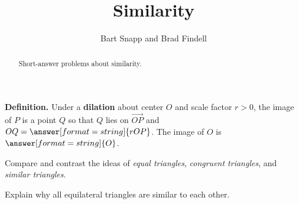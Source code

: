 \documentclass[nooutcomes]{ximera}
\title{Similarity}
\author{Bart Snapp and Brad Findell}
\begin{document}
\begin{abstract}
Short-answer problems about similarity. 
\end{abstract}
\maketitle




%
%
%
%

\begin{question}
\textbf{Definition.} Under a \textbf{dilation} about center $O$ and scale factor $r>0$, the image of $P$ is 
a point $Q$ so that $Q$ lies on $\overrightarrow{OP}$ and $OQ=\answer[format=string]{rOP}$.  The image of $O$ is $\answer[format=string]{O}$. 
\end{question}


\begin{question}
Compare and contrast the ideas of \textit{equal triangles},
  \textit{congruent triangles}, and \textit{similar triangles}.
\begin{freeResponse}
\begin{hint}
\end{hint}
\end{freeResponse}
\end{question}

\begin{question}
Explain why all equilateral triangles are similar to each other.
\begin{freeResponse}
\begin{hint}
\end{hint}
\end{freeResponse}
\end{question}
\end{document}
